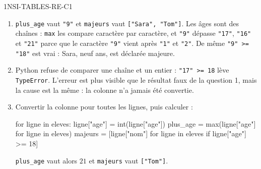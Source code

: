 \begin{corrige}{1NSI-TABLES-RE-C1}
\begin{enumerate}
  \item \lstinline{plus_age} vaut \lstinline{"9"} et \lstinline{majeurs} vaut
        \lstinline{["Sara", "Tom"]}. Les âges sont des chaînes : \lstinline{max} les compare
        caractère par caractère, et \lstinline{"9"} dépasse \lstinline{"17"},
        \lstinline{"16"} et \lstinline{"21"} parce que le caractère \lstinline{"9"} vient
        après \lstinline{"1"} et \lstinline{"2"}. De même \lstinline{"9" >= "18"} est vrai :
        Sara, neuf ans, est déclarée majeure.
  \item Python refuse de comparer une chaîne et un entier : \lstinline{"17" >= 18} lève
        \lstinline{TypeError}. L'erreur est plus visible que le résultat faux de la
        question 1, mais la cause est la même : la colonne n'a jamais été convertie.
  \item Convertir la colonne pour toutes les lignes, puis calculer :
\begin{python}
for ligne in eleves:
    ligne["age"] = int(ligne["age"])
plus_age = max(ligne["age"] for ligne in eleves)
majeurs = [ligne["nom"] for ligne in eleves if ligne["age"] >= 18]
\end{python}
        \lstinline{plus_age} vaut alors $21$ et \lstinline{majeurs} vaut
        \lstinline{["Tom"]}.
\end{enumerate}
\end{corrige}
